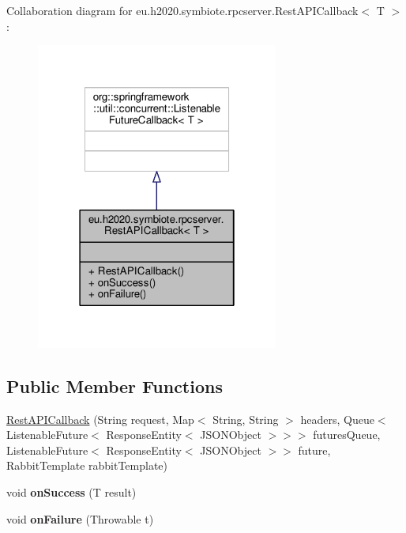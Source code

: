 Collaboration diagram for eu.\+h2020.\+symbiote.\+rpcserver.\+Rest\+A\+P\+I\+Callback$<$ T $>$\+:\nopagebreak
\begin{figure}[H]
\begin{center}
\leavevmode
\includegraphics[width=226pt]{classeu_1_1h2020_1_1symbiote_1_1rpcserver_1_1RestAPICallback__coll__graph}
\end{center}
\end{figure}
\subsection*{Public Member Functions}
\begin{DoxyCompactItemize}
\item 
\hyperlink{classeu_1_1h2020_1_1symbiote_1_1rpcserver_1_1RestAPICallback_ad5c5d0f8a589e0555039a1742642789a}{Rest\+A\+P\+I\+Callback} (String request, Map$<$ String, String $>$ headers, Queue$<$ Listenable\+Future$<$ Response\+Entity$<$ J\+S\+O\+N\+Object $>$$>$$>$ futures\+Queue, Listenable\+Future$<$ Response\+Entity$<$ J\+S\+O\+N\+Object $>$$>$ future, Rabbit\+Template rabbit\+Template)
\item 
\mbox{\label{classeu_1_1h2020_1_1symbiote_1_1rpcserver_1_1RestAPICallback_a7b1388238a670c0a6be303cc827c956b}} 
void {\bfseries on\+Success} (T result)
\item 
\mbox{\label{classeu_1_1h2020_1_1symbiote_1_1rpcserver_1_1RestAPICallback_a0dd62fd546fc035c1cb3324194812710}} 
void {\bfseries on\+Failure} (Throwable t)
\end{DoxyCompactItemize}


